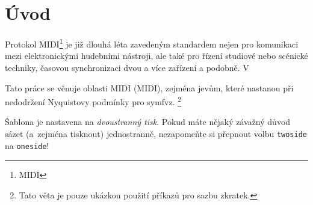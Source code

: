{}
\chapter*{Úvod}

Protokol \acs{MIDI}\footnote{\acl{MIDI}} je již dlouhá léta zavedeným standardem nejen pro komunikaci mezi elektronickými hudebními nástroji, ale také pro řízení studiové nebo scénické techniky, časovou synchronizaci dvou a více zařízení a podobně. V 






Tato práce se věnuje oblasti \acs{MIDI} (\acl{MIDI}), zejména jevům, které nastanou při nedodržení Nyquistovy podmínky pro \ac{symfvz}.%
\footnote{Tato věta je pouze ukázkou použití příkazů pro sazbu zkratek.}

Šablona je nastavena na \emph{dvoustranný tisk}. Pokud máte nějaký závažný důvod sázet (a~zejména tisknout) jednostranně, nezapomeňte si přepnout volbu \texttt{twoside} na \texttt{oneside}!